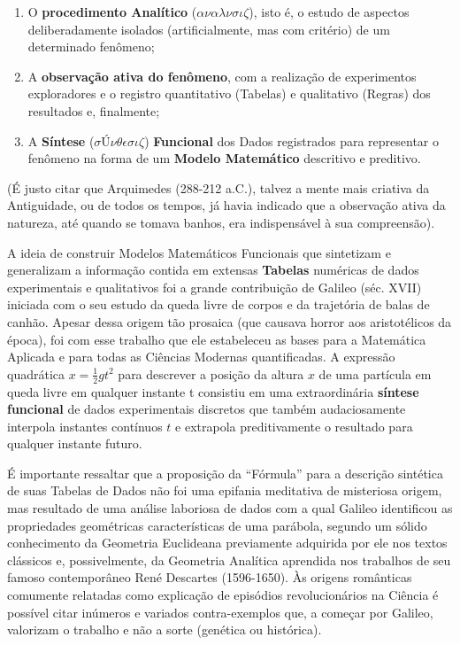\begin{enumerate}
    \item O \textbf{procedimento Analítico} (\(\alpha\nu\alpha\lambda\nu\sigma\iota\zeta\)), isto é, o estudo de aspectos deliberadamente isolados (artificialmente, mas com critério) de um determinado fenômeno;
    \item A \textbf{observação ativa do fenômeno}, com a realização de experimentos exploradores e o registro quantitativo (Tabelas) e qualitativo (Regras) dos resultados e, finalmente;
    \item A \textbf{Síntese} (\(\sigma Ú\nu\theta\epsilon\sigma\iota\zeta\)) \textbf{Funcional} dos Dados registrados para representar o fenômeno na forma de um \textbf{Modelo Matemático} descritivo e preditivo.
\end{enumerate}

    (É justo citar que Arquimedes (288-212 a.C.), talvez a mente mais criativa da Antiguidade, ou de todos os tempos, já havia indicado que a observação ativa da natureza, até quando se tomava banhos, era indispensável à sua compreensão).

    A ideia de construir Modelos Matemáticos Funcionais que sintetizam e generalizam a informação contida em extensas \textbf{Tabelas} numéricas de dados experimentais e qualitativos foi a grande contribuição de Galileo (séc. XVII) iniciada com o seu estudo da queda livre de corpos e da trajetória de balas de canhão. Apesar dessa origem tão prosaica (que causava horror aos aristotélicos da época), foi com esse trabalho que ele estabeleceu as bases para a Matemática Aplicada e para todas as Ciências Modernas quantificadas. A expressão quadrática \(x = \frac{1}{2}gt^2\) para descrever a posição da altura \(x\) de uma partícula em queda livre em qualquer instante t consistiu em uma extraordinária \textbf{síntese funcional} de dados experimentais discretos que também audaciosamente interpola instantes contínuos \(t\) e extrapola preditivamente o resultado para qualquer instante futuro.

    É importante ressaltar que a proposição da ``Fórmula'' para a descrição sintética de suas Tabelas de Dados não foi uma epifania meditativa de misteriosa origem, mas resultado de uma análise laboriosa de dados com a qual Galileo identificou as propriedades geométricas características de uma parábola, segundo um sólido conhecimento da Geometria Euclideana previamente adquirida por ele nos textos clássicos e, possivelmente, da Geometria Analítica aprendida nos trabalhos de seu famoso contemporâneo René Descartes (1596-1650). Às origens românticas comumente relatadas como explicação de episódios revolucionários na Ciência é possível citar inúmeros e variados contra-exemplos que, a começar por Galileo, valorizam o trabalho e não a sorte (genética ou histórica).

